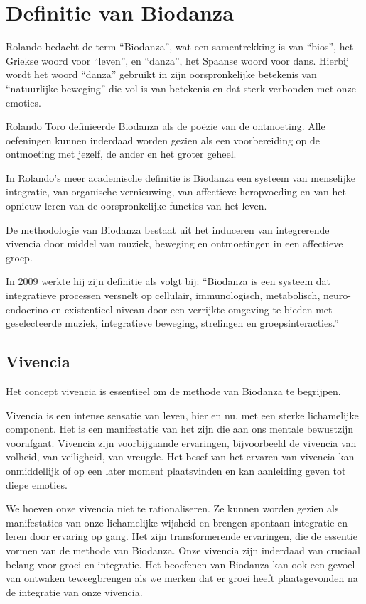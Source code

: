 \documentclass[
  11pt,
]{book}
\begin{document}
\hypertarget{definitie-van-biodanza}{%
\section{Definitie van Biodanza}\label{definitie-van-biodanza}}

Rolando bedacht de term ``Biodanza'', wat een samentrekking is van ``bios'', het Griekse woord voor ``leven'', en ``danza'', het Spaanse woord voor dans. Hierbij wordt het woord ``danza'' gebruikt in zijn oorspronkelijke betekenis van ``natuurlijke beweging'' die vol is van betekenis en dat sterk verbonden met onze emoties.

Rolando Toro definieerde Biodanza als de poëzie van de ontmoeting. Alle oefeningen kunnen inderdaad worden gezien als een voorbereiding op de ontmoeting met jezelf, de ander en het groter geheel.

In Rolando's meer academische definitie is Biodanza een systeem van menselijke integratie, van organische vernieuwing, van affectieve heropvoeding en van het opnieuw leren van de oorspronkelijke functies van het leven.

De methodologie van Biodanza bestaat uit het induceren van integrerende vivencia door middel van muziek, beweging en ontmoetingen in een affectieve groep.

In 2009 werkte hij zijn definitie als volgt bij: ``Biodanza is een systeem dat integratieve processen versnelt op cellulair, immunologisch, metabolisch, neuro-endocrino en existentieel niveau door een verrijkte omgeving te bieden met geselecteerde muziek, integratieve beweging, strelingen en groepsinteracties.''

\hypertarget{vivencia}{%
\subsection{Vivencia}\label{vivencia}}

Het concept vivencia is essentieel om de methode van Biodanza te begrijpen.

Vivencia is een intense sensatie van leven, hier en nu, met een sterke lichamelijke component. Het is een manifestatie van het zijn die aan ons mentale bewustzijn voorafgaat. Vivencia zijn voorbijgaande ervaringen, bijvoorbeeld de vivencia van volheid, van veiligheid, van vreugde. Het besef van het ervaren van vivencia kan onmiddellijk of op een later moment plaatsvinden en kan aanleiding geven tot diepe emoties.

We hoeven onze vivencia niet te rationaliseren. Ze kunnen worden gezien als manifestaties van onze lichamelijke wijsheid en brengen spontaan integratie en leren door ervaring op gang. Het zijn transformerende ervaringen, die de essentie vormen van de methode van Biodanza. Onze vivencia zijn inderdaad van cruciaal belang voor groei en integratie. Het beoefenen van Biodanza kan ook een gevoel van ontwaken teweegbrengen als we merken dat er groei heeft plaatsgevonden na de integratie van onze vivencia.
\end{document}
